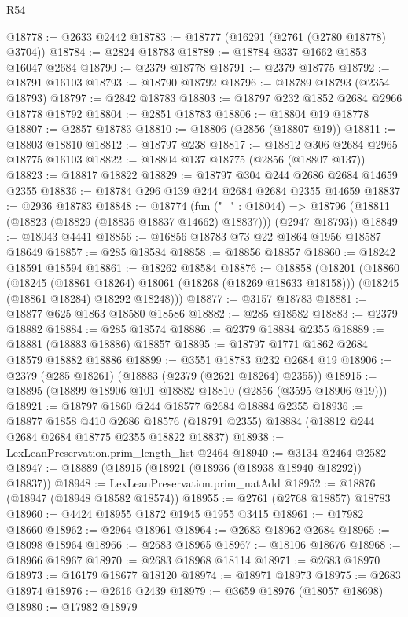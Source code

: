 \begin{lexlean}{R54}
\begin{coremodule}
@18778 := @2633 @2442
@18783 := @18777 (@16291 (@2761 (@2780 @18778) @3704))
@18784 := @2824 @18783
@18789 := @18784 @337 @1662 @1853 @16047 @2684
@18790 := @2379 @18778
@18791 := @2379 @18775
@18792 := @18791 @16103
@18793 := @18790 @18792
@18796 := @18789 @18793 (@2354 @18793)
@18797 := @2842 @18783
@18803 := @18797 @232 @1852 @2684 @2966 @18778 @18792
@18804 := @2851 @18783
@18806 := @18804 @19 @18778
@18807 := @2857 @18783
@18810 := @18806 (@2856 (@18807 @19))
@18811 := @18803 @18810
@18812 := @18797 @238
@18817 := @18812 @306 @2684 @2965 @18775 @16103
@18822 := @18804 @137 @18775 (@2856 (@18807 @137))
@18823 := @18817 @18822
@18829 := @18797 @304 @244 @2686 @2684 @14659 @2355
@18836 := @18784 @296 @139 @244 @2684 @2684 @2355 @14659
@18837 := @2936 @18783
@18848 := @18774
    (fun ("_" : @18044) =>
    @18796 (@18811 (@18823 (@18829 (@18836 @18837 @14662) @18837))) (@2947 @18793))
@18849 := @18043 @4441
@18856 := @16856 @18783 @73 @22 @1864 @1956 @18587 @18649
@18857 := @285 @18584
@18858 := @18856 @18857
@18860 := @18242 @18591 @18594
@18861 := @18262 @18584
@18876 := @18858
    (@18201
      (@18860
        (@18245 (@18861 @18264) @18061 (@18268 (@18269 @18633 @18158)))
        (@18245 (@18861 @18284) @18292 @18248)))
@18877 := @3157 @18783
@18881 := @18877 @625 @1863 @18580 @18586
@18882 := @285 @18582
@18883 := @2379 @18882
@18884 := @285 @18574
@18886 := @2379 @18884 @2355
@18889 := @18881 (@18883 @18886) @18857
@18895 := @18797 @1771 @1862 @2684 @18579 @18882 @18886
@18899 := @3551 @18783 @232 @2684 @19
@18906 := @2379 (@285 @18261) (@18883 (@2379 (@2621 @18264) @2355))
@18915 := @18895 (@18899 @18906 @101 @18882 @18810 (@2856 (@3595 @18906 @19)))
@18921 := @18797 @1860 @244 @18577 @2684 @18884 @2355
@18936 := @18877
    @1858
    @410
    @2686
    @18576
    (@18791 @2355)
    @18884
    (@18812 @244 @2684 @2684 @18775 @2355 @18822 @18837)
@18938 := LexLeanPreservation.prim_length_list @2464
@18940 := @3134 @2464 @2582
@18947 := @18889 (@18915 (@18921 (@18936 (@18938 @18940 @18292)) @18837))
@18948 := LexLeanPreservation.prim_natAdd
@18952 := @18876 (@18947 (@18948 @18582 @18574))
@18955 := @2761 (@2768 @18857) @18783
@18960 := @4424 @18955 @1872 @1945 @1955 @3415
@18961 := @17982 @18660
@18962 := @2964 @18961
@18964 := @2683 @18962 @2684
@18965 := @18098 @18964
@18966 := @2683 @18965
@18967 := @18106 @18676
@18968 := @18966 @18967
@18970 := @2683 @18968 @18114
@18971 := @2683 @18970
@18973 := @16179 @18677 @18120
@18974 := @18971 @18973
@18975 := @2683 @18974
@18976 := @2616 @2439
@18979 := @3659 @18976 (@18057 @18698)
@18980 := @17982 @18979

\end{coremodule}
\end{lexlean}
